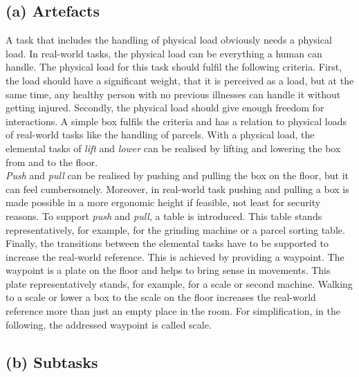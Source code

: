 \subsection{(a) Artefacts}
A task that includes the handling of physical load obviously needs a physical load. In real-world tasks, the physical load can be everything a human can handle. The physical load for this task should fulfil the following criteria. First, the load should have a significant weight, that it is perceived as a load, but at the same time, any healthy person with no previous illnesses can handle it without getting injured. Secondly, the physical load should give enough freedom for interactions. A simple box fulfils the criteria and has a relation to physical loads of real-world tasks like the handling of parcels. With a physical load, the elemental tasks of \textit{lift} and \textit{lower} can be realised by lifting and lowering the box from and to the floor.\\
\textit{Push} and \textit{pull} can be realised by pushing and pulling the box on the floor, but it can feel cumbersomely. Moreover, in real-world task pushing and pulling a box is made possible in a more ergonomic height if feasible, not least for security reasons. To support \textit{push} and \textit{pull}, a table is introduced. This table stands representatively, for example, for the grinding machine or a parcel sorting table.\\
Finally, the transitions between the elemental tasks have to be supported to increase the real-world reference. This is achieved by providing a waypoint. The waypoint is a plate on the floor and helps to bring sense in movements. This plate representatively stands, for example, for a scale or second machine. Walking to a scale or lower a box to the scale on the floor increases the real-world reference more than just an empty place in the room. For simplification, in the following, the addressed waypoint is called scale.

\subsection{(b) Subtasks}
\label{sec:subTasks}

